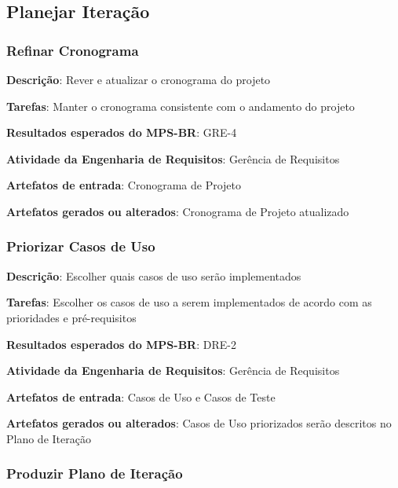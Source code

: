 \subsection{Planejar Iteração}

\subsubsection{Refinar Cronograma}

\begin{description}
\item\textbf{Descrição}: Rever e atualizar o cronograma do projeto
\item\textbf{Tarefas}: Manter o cronograma consistente com o andamento do projeto
\item\textbf{Resultados esperados do MPS-BR}: GRE-4
\item\textbf{Atividade da Engenharia de Requisitos}: Gerência de Requisitos
\item\textbf{Artefatos de entrada}: Cronograma de Projeto
\item\textbf{Artefatos gerados ou alterados}: Cronograma de Projeto atualizado
\end{description}

\subsubsection{Priorizar Casos de Uso}

\begin{description}
\item\textbf{Descrição}: Escolher quais casos de uso serão implementados
\item\textbf{Tarefas}: Escolher os casos de uso a serem implementados de acordo com as prioridades e pré-requisitos
\item\textbf{Resultados esperados do MPS-BR}: DRE-2
\item\textbf{Atividade da Engenharia de Requisitos}: Gerência de Requisitos
\item\textbf{Artefatos de entrada}: Casos de Uso e Casos de Teste
\item\textbf{Artefatos gerados ou alterados}: Casos de Uso priorizados serão descritos no Plano de Iteração
\end{description}

\subsubsection{Produzir Plano de Iteração}

